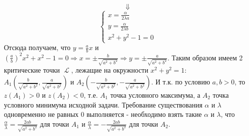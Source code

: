 \documentclass{article}
\DeclareMathOperator{\lagr}{\mathcal{L}}
\begin{document}
$$\Downarrow$$
\begin{equation*}
 \begin{cases}
   x = \frac{\alpha}{2\lambda a}\\
   y = \frac{\alpha}{2\lambda b}\\
   x^2+y^2-1=0
 \end{cases}
\end{equation*}
Отсюда получаем, что $y = \frac{a}{b} x$ и $\left(\frac{a}{b}\right)^2x^2+x^2-1=0\Rightarrow x=\pm \frac{b}{\sqrt{a^2+b^2}}\Rightarrow y = \pm \frac{a}{\sqrt{a^2+b^2}}$. Таким образом имеем 2 критические точки $\lagr$, лежащие на окружности $x^2+y^2=1$: $A_1(\frac{b}{\sqrt{a^2+b^2}}, \frac{a}{\sqrt{a^2+b^2}})$ и $A_2(-\frac{b}{\sqrt{a^2+b^2}}, -\frac{a}{\sqrt{a^2+b^2}})$. И т.к. по условию $a,b > 0$, то $z(A_1) > 0$ и $z(A_2) < 0$, т.е. $A_1$ точка условного максимума, а $A_2$ точка условного минимума исходной задачи. Требование существования $\alpha$ и $\lambda$ одновременно не равных 0 выполняется - необходимо взять такие $\alpha$ и $\lambda$, что $\frac{\alpha}{\lambda} = \frac{2ab}{\sqrt{a^2+b^2}}$ для точки $A_1$ и $\frac{\alpha}{\lambda} = -\frac{2ab}{\sqrt{a^2+b^2}}$ для точки $A_2$.
\end{document}
